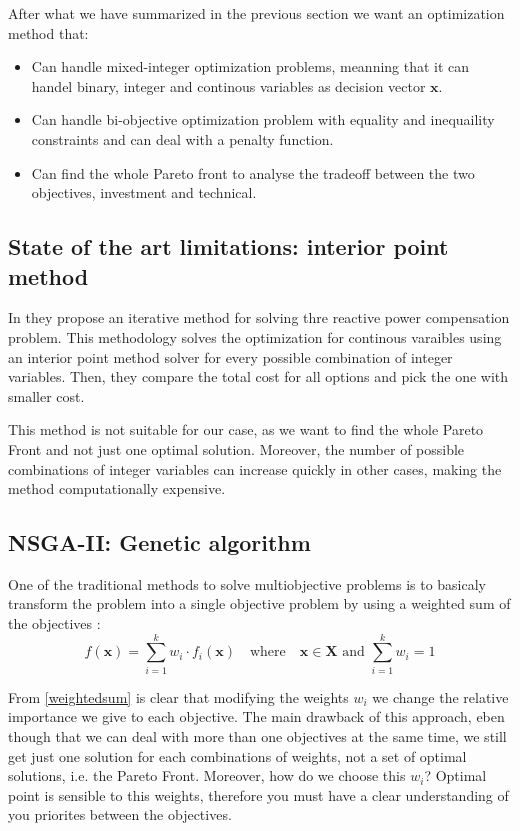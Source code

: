 \documentclass[a4paper,11pt, titlepage, twoside]{article}
\begin{document}
After what we have summarized in the previous section we want an optimization method that:
\begin{itemize}
    \item Can handle mixed-integer optimization problems, meanning that it can handel binary, integer and continous variables as decision vector $\mathbf{x}$.
    \item Can handle bi-objective optimization problem with equality and inequaility constraints and can deal with a penalty function.
    \item Can find the whole Pareto front to analyse the tradeoff between the two objectives, investment and technical.
\end{itemize}

\subsection{State of the art limitations: interior point method}

In \cite{paperbase} they propose an iterative method for solving thre reactive power compensation problem. This methodology solves the optimization
for continous varaibles using an interior point method solver \cite{ipm} for every possible combination of integer variables. Then, they compare the total
cost for all options and pick the one with smaller cost.\par 

This method is not suitable for our case, as we want to find the whole Pareto Front and not just one optimal solution. Moreover, the number of possible combinations of integer variables
can increase quickly in other cases, making the method computationally expensive.


\subsection{NSGA-II: Genetic algorithm}\label{NSGAII}

One of the traditional methods to solve multiobjective problems is to basicaly transform the problem into a single objective problem by using a weighted sum of the objectives \cite{nsgai}:
\begin{equation}\label{weightedsum}
    f(\mathbf{x}) = \sum_{i=1}^{k} w_i \cdot f_i(\mathbf{x}) \quad \text{where} \quad \mathbf{x} \in \mathbf{X} \text{ and } \sum_{i=1}^{k} w_i = 1
\end{equation}

From \ref{weightedsum} is clear that modifying the weights $w_i$ we change the relative importance we give to each objective. The main drawback of this approach, eben though that we can deal with more than one objectives at the same time, we
still get just one solution for each combinations of weights, not a set of optimal solutions, i.e. the Pareto Front. Moreover, how do we choose this $w_i$? Optimal point is sensible to this weights, therefore you must have
a clear understanding of you priorites between the objectives.\par
\end{document}
